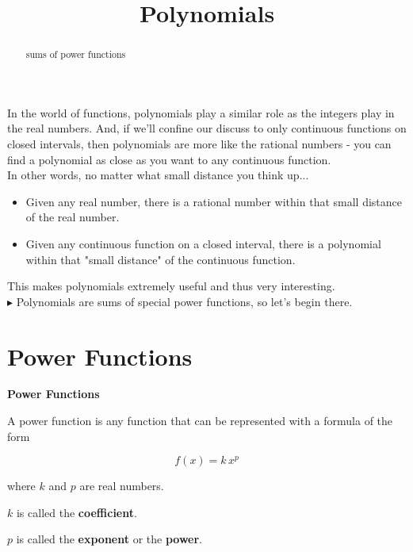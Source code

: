 \documentclass{ximera}
\title{Polynomials}
\begin{document}
\begin{abstract}
sums of power functions
\end{abstract}
\maketitle


In the world of functions, polynomials play a similar role as the integers play in the real numbers. And, if we'll confine our discuss to only continuous functions on closed intervals, then polynomials are more like the rational numbers - you can find a polynomial as close as you want to any continuous function. \\


In other words, no matter what small distance you think up...

\begin{itemize}
\item Given any real number, there is a rational number within that small distance of the real number.

\item Given any continuous function on a closed interval, there is a polynomial within that "small distance" of the continuous function.
\end{itemize}

This makes polynomials extremely useful and thus very interesting. \\


$\blacktriangleright$ Polynomials are sums of special power functions, so let's begin there.













\section{Power Functions}

\begin{definition} \textbf{\textcolor{green!50!black}{Power Functions}}

A power function is any function that can be represented with a formula of the form

\[   f(x) = k \, x^p      \]

where $k$ and $p$ are real numbers.

$k$ is called the \textbf{coefficient}.

$p$ is called the \textbf{exponent} or the \textbf{power}.


\end{definition}
\end{document}
